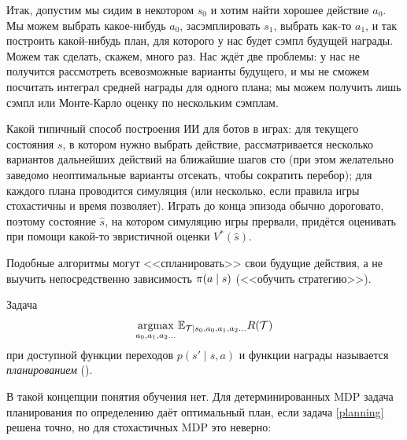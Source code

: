 Итак, допустим мы сидим в некотором $s_0$ и хотим найти хорошее действие $a_0$. Мы можем выбрать какое-нибудь $a_0$, засэмплировать $s_1$, выбрать как-то $a_1$, и так построить какой-нибудь план, для которого у нас будет сэмпл будущей награды. Можем так сделать, скажем, много раз. Нас ждёт две проблемы: у нас не получится рассмотреть всевозможные варианты будущего, и мы не сможем посчитать интеграл средней награды для одного плана; мы можем получить лишь сэмпл или Монте-Карло оценку по нескольким сэмплам.

\begin{example}
Какой типичный способ построения ИИ для ботов в играх: для текущего состояния $s$, в котором нужно выбрать действие, рассматривается несколько вариантов дальнейших действий на ближайшие шагов сто (при этом желательно заведомо неоптимальные варианты отсекать, чтобы сократить перебор); для каждого плана проводится симуляция (или несколько, если правила игры стохастичны и время позволяет). Играть до конца эпизода обычно дороговато, поэтому состояние $\hat{s}$, на котором симуляцию игры прервали, придётся оценивать при помощи какой-то эвристичной оценки $V^*(\hat{s})$.
\end{example}

Подобные алгоритмы могут <<спланировать>> свои будущие действия, а не выучить непосредственно зависимость $\pi(a \HM\mid s)$ (<<обучить стратегию>>).

\begin{definition}
Задача
\begin{equation}\label{planning}
\mathop{\mathrm{argmax}}_{a_0, a_1, a_2 \dots} \mathbb{E}_{\mathcal{T} \mid s_0, a_0, a_1, a_2 \dots} R(\mathcal{T})
\end{equation}
при доступной функции переходов $p(s' \mid s, a)$ и функции награды называется \emph{планированием} ().
\end{definition}

В такой концепции понятия обучения нет. Для детерминированных MDP задача планирования по определению даёт оптимальный план, если задача \eqref{planning} решена точно, но для стохастичных MDP это неверно: 

